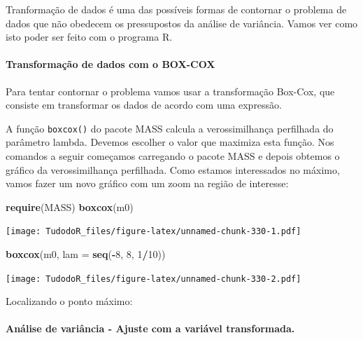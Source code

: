 \documentclass[
]{book}
\newenvironment{Shaded}{\begin{snugshade}}{\end{snugshade}}
\newcommand{\DataTypeTok}[1]{\textcolor[rgb]{0.13,0.29,0.53}{#1}}
\newcommand{\DecValTok}[1]{\textcolor[rgb]{0.00,0.00,0.81}{#1}}
\newcommand{\KeywordTok}[1]{\textcolor[rgb]{0.13,0.29,0.53}{\textbf{#1}}}
\newcommand{\NormalTok}[1]{#1}
\newcommand{\OperatorTok}[1]{\textcolor[rgb]{0.81,0.36,0.00}{\textbf{#1}}}
\begin{document}
Tranformação de dados é uma das possíveis formas de contornar o problema de dados que não obedecem os pressupostos da análise de variância. Vamos ver como isto poder ser feito com o programa R.

\hypertarget{transformauxe7uxe3o-de-dados-com-o-box-cox}{%
\paragraph{Transformação de dados com o BOX-COX}\label{transformauxe7uxe3o-de-dados-com-o-box-cox}}

Para tentar contornar o problema vamos usar a transformação Box-Cox, que consiste em transformar os dados de acordo com uma expressão.

A função \texttt{boxcox()} do pacote MASS calcula a verossimilhança perfilhada do parâmetro lambda. Devemos escolher o valor que maximiza esta função. Nos comandos a seguir começamos carregando o pacote MASS e depois obtemos o gráfico da verossimilhança perfilhada. Como estamos interessados no máximo, vamos fazer um novo gráfico com um zoom na região de interesse:

\begin{Shaded}
\begin{Highlighting}[]
\KeywordTok{require}\NormalTok{(MASS) }
  \KeywordTok{boxcox}\NormalTok{(m0)}
\end{Highlighting}
\end{Shaded}

\texttt{[image: TudodoR\_files/figure-latex/unnamed-chunk-330-1.pdf]}

\begin{Shaded}
\begin{Highlighting}[]
  \KeywordTok{boxcox}\NormalTok{(m0, }\DataTypeTok{lam =} \KeywordTok{seq}\NormalTok{(}\OperatorTok{-}\DecValTok{8}\NormalTok{, }\DecValTok{8}\NormalTok{, }\DecValTok{1}\OperatorTok{/}\DecValTok{10}\NormalTok{))}
\end{Highlighting}
\end{Shaded}

\texttt{[image: TudodoR\_files/figure-latex/unnamed-chunk-330-2.pdf]}

Localizando o ponto máximo:

\hypertarget{anuxe1lise-de-variuxe2ncia---ajuste-com-a-variuxe1vel-transformada.-1}{%
\paragraph{Análise de variância - Ajuste com a variável transformada.}\label{anuxe1lise-de-variuxe2ncia---ajuste-com-a-variuxe1vel-transformada.-1}}
\end{document}
